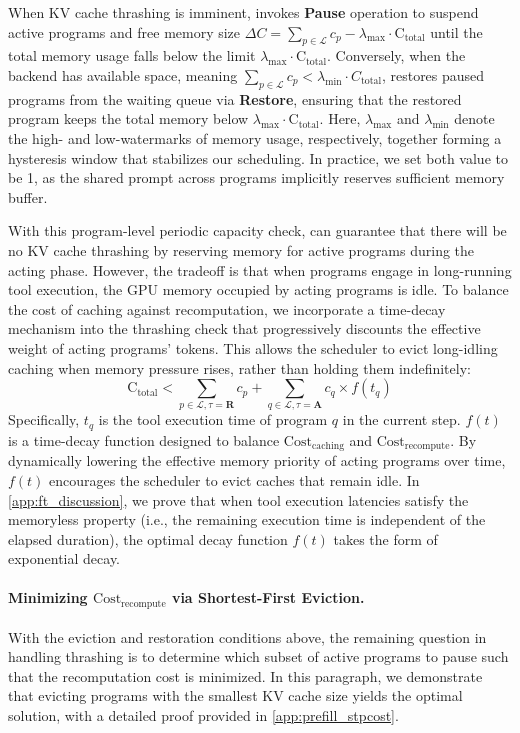 When KV cache thrashing is imminent, \ouralg invokes \textbf{Pause} operation to suspend active programs and free memory size $\Delta C = \sum_{p \in \mathcal{L}} c_p - \lambda_{\max} \cdot \text{C}_{\text{total}}$ until the total memory usage falls below the limit $\lambda_{\max} \cdot \text{C}_{\text{total}}$. Conversely, when the backend has available space, meaning
$\sum_{p \in \mathcal{L}} c_p < \lambda_{\min} \cdot C_{\text{total}}$, \ouralg restores paused programs from the waiting queue via \textbf{Restore}, ensuring that the restored program keeps the total memory below $\lambda_{\max} \cdot \text{C}_{\text{total}}$. Here, $\lambda_{\max}$ and $\lambda_{\min}$ denote the high- and low-watermarks
of memory usage, respectively, together forming a hysteresis window that
stabilizes our scheduling. In practice, we set both value to be 1, as the shared prompt across programs implicitly reserves sufficient memory buffer.

With this program-level periodic capacity check, \ouralg can guarantee that there will be no KV cache thrashing by reserving memory for active programs during the acting phase. However, the tradeoff is that when programs engage in long-running tool execution, the GPU memory occupied by acting programs is idle. To balance the cost of caching against recomputation, we incorporate a time-decay mechanism into the thrashing check that progressively discounts the effective weight of acting programs' tokens. This allows the scheduler to evict long-idling caching when memory pressure rises, rather than holding them indefinitely:
\begin{equation}
\label{eq:time_decay}
    \text{C}_{\text{total}} < \sum_{p \in \mathcal{L},\tau = \textbf{R}} c_p +\sum_{q \in \mathcal{L},\tau = \textbf{A}} c_q \times f(t_q)
\end{equation}
Specifically, $t_q$ is the tool execution time of program $q$ in the current step. $f(t)$ is a time-decay function designed to balance $\text{Cost}_{\text{caching}}$ and $\text{Cost}_{\text{recompute}}$. By dynamically lowering the effective memory priority of acting programs over time, $f(t)$ encourages the scheduler to evict caches that remain idle.
In \autoref{app:ft_discussion}, we prove that when tool execution latencies satisfy the memoryless property (i.e., the remaining execution time is independent of the elapsed duration), the optimal decay function $f(t)$ takes the form of exponential decay.

\paragraph{Minimizing $\text{Cost}_{\text{recompute}}$ via Shortest-First Eviction.}
With the eviction and restoration conditions above, the remaining question in handling thrashing is to determine which subset of active programs to pause such that the recomputation cost is minimized. In this paragraph, we demonstrate that evicting programs with the smallest KV cache size yields the optimal solution, with a detailed proof provided in \autoref{app:prefill_stpcost}.

